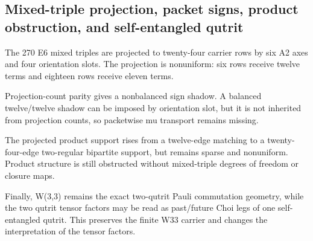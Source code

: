 \subsection{Mixed-triple projection, packet signs, product obstruction, and self-entangled qutrit}
\label{sec:bt1553-bt1556-mixed-projection-self-qutrit}

The 270 E6 mixed triples are projected to twenty-four carrier rows by six A2 axes and four orientation slots.  The projection is nonuniform: six rows receive twelve terms and eighteen rows receive eleven terms.

Projection-count parity gives a nonbalanced sign shadow.  A balanced twelve/twelve shadow can be imposed by orientation slot, but it is not inherited from projection counts, so packetwise mu transport remains missing.

The projected product support rises from a twelve-edge matching to a twenty-four-edge two-regular bipartite support, but remains sparse and nonuniform.  Product structure is still obstructed without mixed-triple degrees of freedom or closure maps.

Finally, W(3,3) remains the exact two-qutrit Pauli commutation geometry, while the two qutrit tensor factors may be read as past/future Choi legs of one self-entangled qutrit.  This preserves the finite W33 carrier and changes the interpretation of the tensor factors.
